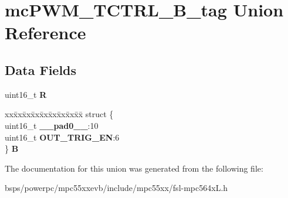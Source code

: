 \hypertarget{unionmcPWM__TCTRL__16B__tag}{}\section{mc\+P\+W\+M\+\_\+\+T\+C\+T\+R\+L\+\_\+B\+\_\+tag Union Reference}
\label{unionmcPWM__TCTRL__16B__tag}
\subsection*{Data Fields}
\begin{DoxyCompactItemize}
\item 
\mbox{\label{unionmcPWM__TCTRL__16B__tag_ace6591bbd336a221d3ac2fe38a5c8fa6}} 
uint16\+\_\+t {\bfseries R}
\item 
\mbox{\label{unionmcPWM__TCTRL__16B__tag_a72e7761bb722f4243cc3f6b067c2d5c0}} 
\begin{tabbing}
xx\=xx\=xx\=xx\=xx\=xx\=xx\=xx\=xx\=\kill
struct \{\\
\>uint16\_t {\bfseries \_\_pad0\_\_}:10\\
\>uint16\_t {\bfseries OUT\_TRIG\_EN}:6\\
\} {\bfseries B}\\

\end{tabbing}\end{DoxyCompactItemize}


The documentation for this union was generated from the following file\+:\begin{DoxyCompactItemize}
\item 
bsps/powerpc/mpc55xxevb/include/mpc55xx/fsl-\/mpc564x\+L.\+h\end{DoxyCompactItemize}
